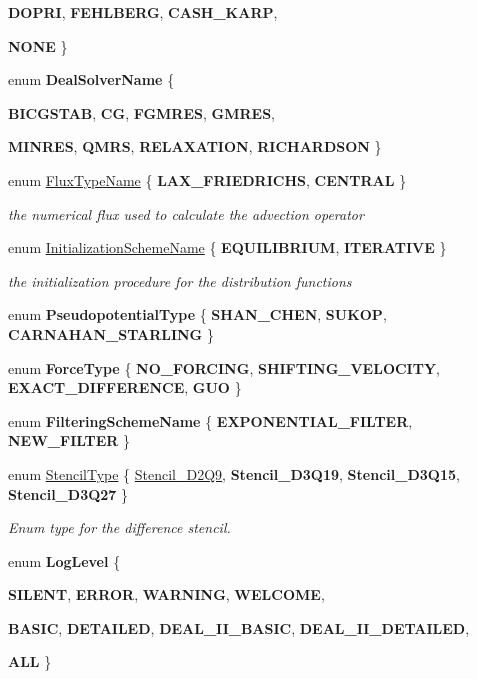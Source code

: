 \begin{DoxyCompactItemize}
{\bfseries DOPRI}, 
{\bfseries FEHLBERG}, 
{\bfseries CASH\_\-KARP}, 
\par
{\bfseries NONE}
 \}
\item 
enum {\bfseries DealSolverName} \{ \par
{\bfseries BICGSTAB}, 
{\bfseries CG}, 
{\bfseries FGMRES}, 
{\bfseries GMRES}, 
\par
{\bfseries MINRES}, 
{\bfseries QMRS}, 
{\bfseries RELAXATION}, 
{\bfseries RICHARDSON}
 \}
\item 
enum \hyperlink{namespacenatrium_a9366e68e932696b3dc277fc010ac1057}{FluxTypeName} \{ {\bfseries LAX\_\-FRIEDRICHS}, 
{\bfseries CENTRAL}
 \}
\begin{DoxyCompactList}\small\item\em the numerical flux used to calculate the advection operator \item\end{DoxyCompactList}\item 
enum \hyperlink{namespacenatrium_a5aad7d448441836f9c631c505cf8cd54}{InitializationSchemeName} \{ {\bfseries EQUILIBRIUM}, 
{\bfseries ITERATIVE}
 \}
\begin{DoxyCompactList}\small\item\em the initialization procedure for the distribution functions \item\end{DoxyCompactList}\item 
enum {\bfseries PseudopotentialType} \{ {\bfseries SHAN\_\-CHEN}, 
{\bfseries SUKOP}, 
{\bfseries CARNAHAN\_\-STARLING}
 \}
\item 
enum {\bfseries ForceType} \{ {\bfseries NO\_\-FORCING}, 
{\bfseries SHIFTING\_\-VELOCITY}, 
{\bfseries EXACT\_\-DIFFERENCE}, 
{\bfseries GUO}
 \}
\item 
enum {\bfseries FilteringSchemeName} \{ {\bfseries EXPONENTIAL\_\-FILTER}, 
{\bfseries NEW\_\-FILTER}
 \}
\item 
enum \hyperlink{namespacenatrium_a45d5dacaf5eb5efde670179d949173ba}{StencilType} \{ \hyperlink{namespacenatrium_a45d5dacaf5eb5efde670179d949173baabe9c0ce3734a5131262789758ca5fbd1}{Stencil\_\-D2Q9}, 
{\bfseries Stencil\_\-D3Q19}, 
{\bfseries Stencil\_\-D3Q15}, 
{\bfseries Stencil\_\-D3Q27}
 \}
\begin{DoxyCompactList}\small\item\em Enum type for the difference stencil. \item\end{DoxyCompactList}\item 
enum {\bfseries LogLevel} \{ \par
{\bfseries SILENT}, 
{\bfseries ERROR}, 
{\bfseries WARNING}, 
{\bfseries WELCOME}, 
\par
{\bfseries BASIC}, 
{\bfseries DETAILED}, 
{\bfseries DEAL\_\-II\_\-BASIC}, 
{\bfseries DEAL\_\-II\_\-DETAILED}, 
\par
{\bfseries ALL}
 \}
\end{DoxyCompactItemize}
